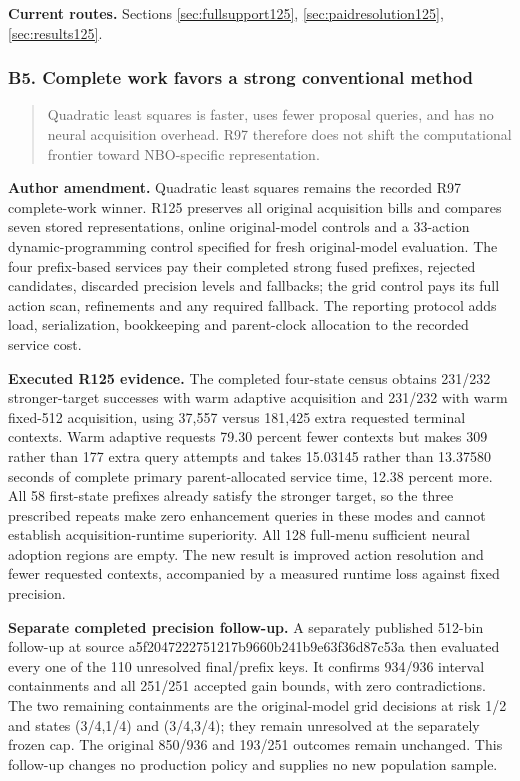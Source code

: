 \noindent\textbf{Current routes.} Sections \ref{sec:fullsupport125}, \ref{sec:paidresolution125}, \ref{sec:results125}.

\subsubsection{B5. Complete work favors a strong conventional method}

\begin{quote}\small
Quadratic least squares is faster, uses fewer proposal queries, and has no neural acquisition overhead. R97 therefore does not shift the computational frontier toward NBO-specific representation.
\end{quote}

\noindent\textbf{Author amendment.} Quadratic least squares remains the recorded R97 complete-work winner. R125 preserves all original acquisition bills and compares seven stored representations, online original-model controls and a 33-action dynamic-programming control specified for fresh original-model evaluation. The four prefix-based services pay their completed strong fused prefixes, rejected candidates, discarded precision levels and fallbacks; the grid control pays its full action scan, refinements and any required fallback. The reporting protocol adds load, serialization, bookkeeping and parent-clock allocation to the recorded service cost.

\noindent\textbf{Executed R125 evidence.} The completed four-state census obtains 231/232 stronger-target successes with warm adaptive acquisition and 231/232 with warm fixed-512 acquisition, using 37,557 versus 181,425 extra requested terminal contexts. Warm adaptive requests 79.30 percent fewer contexts but makes 309 rather than 177 extra query attempts and takes 15.03145 rather than 13.37580 seconds of complete primary parent-allocated service time, 12.38 percent more. All 58 first-state prefixes already satisfy the stronger target, so the three prescribed repeats make zero enhancement queries in these modes and cannot establish acquisition-runtime superiority. All 128 full-menu sufficient neural adoption regions are empty. The new result is improved action resolution and fewer requested contexts, accompanied by a measured runtime loss against fixed precision.

\noindent\textbf{Separate completed precision follow-up.} A separately published 512-bin follow-up at source a5f2047222751217b9660b241b9e63f36d87c53a then evaluated every one of the 110 unresolved final/prefix keys. It confirms 934/936 interval containments and all 251/251 accepted gain bounds, with zero contradictions. The two remaining containments are the original-model grid decisions at risk 1/2 and states (3/4,1/4) and (3/4,3/4); they remain unresolved at the separately frozen cap. The original 850/936 and 193/251 outcomes remain unchanged. This follow-up changes no production policy and supplies no new population sample.

